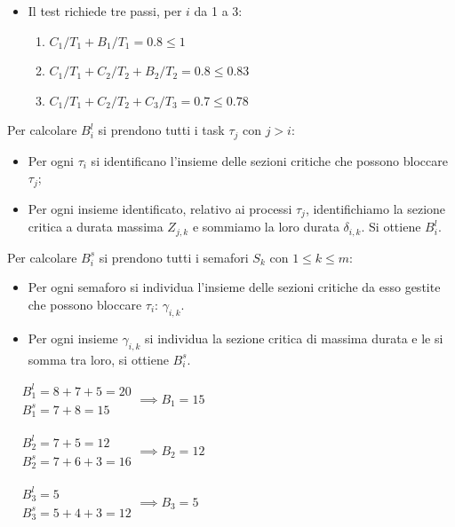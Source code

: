 \documentclass[11pt,a4paper]{report}
\begin{document}
\begin{itemize}
    \item Il test richiede tre passi, per $i$ da 1 a 3:
    \begin{enumerate}
        \item $C_1/T_1 + B_1/T_1 = 0.8 \le 1$
        \item $C_1/T_1 + C_2/T_2 + B_2/T_2 = 0.8 \le 0.83$
        \item $C_1/T_1 + C_2/T_2 + C_3/T_3 = 0.7 \le 0.78$
    \end{enumerate}
\end{itemize}

Per calcolare $B_i^l$ si prendono tutti i task $\tau_j$ con $j > i$:
\begin{itemize}
    \item Per ogni $\tau_i$ si identificano l'insieme delle sezioni critiche che possono bloccare $\tau_j$;
    \item Per ogni insieme identificato, relativo ai processi $\tau_j$, identifichiamo la sezione critica a durata massima $Z_{j,k}$ e sommiamo la loro durata $\delta_{i,k}$. Si ottiene $B_i^l$.
\end{itemize}

Per calcolare $B_i^s$ si prendono tutti i semafori $S_k$ con $1 \le k \le m$:
\begin{itemize}
    \item Per ogni semaforo si individua l'insieme delle sezioni critiche da esso gestite che possono bloccare $\tau_i$: $\gamma_{i,k}$.
    \item Per ogni insieme $\gamma_{i,k}$ si individua la sezione critica di massima durata e le si somma tra loro, si ottiene $B_i^s$.
\end{itemize}

$\begin{aligned}
&B_1^l = 8 + 7 + 5 = 20 \\
&B_1^s = 7 + 8 = 15
\end{aligned} \implies B_1 = 15$

$\begin{aligned}
&B_2^l = 7 + 5 = 12 \\
&B_2^s = 7 + 6 + 3 = 16
\end{aligned} \implies B_2 = 12$

$\begin{aligned}
&B_3^l = 5 \\
&B_3^s = 5 + 4 + 3 = 12
\end{aligned} \implies B_3 = 5$
\end{document}
